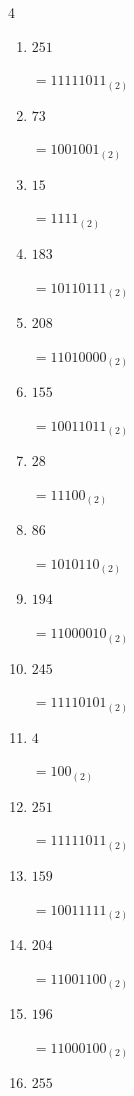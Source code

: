\begin{multicols}{4}
\begin{enumerate}
        $=11001110_{(2)}$

  \item $251$

        $=11111011_{(2)}$

  \item $73$

        $=1001001_{(2)}$

  \item $15$

        $=1111_{(2)}$

  \item $183$

        $=10110111_{(2)}$

  \item $208$

        $=11010000_{(2)}$

\columnbreak %

\resetques

  \item $155$

        $=10011011_{(2)}$

  \item $28$

        $=11100_{(2)}$

  \item $86$

        $=1010110_{(2)}$

  \item $194$

        $=11000010_{(2)}$

  \item $245$

        $=11110101_{(2)}$

  \item $4$

        $=100_{(2)}$

  \item $251$

        $=11111011_{(2)}$

  \item $159$

        $=10011111_{(2)}$

  \item $204$

        $=11001100_{(2)}$

  \item $196$

        $=11000100_{(2)}$

  \item $255$


\end{enumerate}
\end{multicols}
